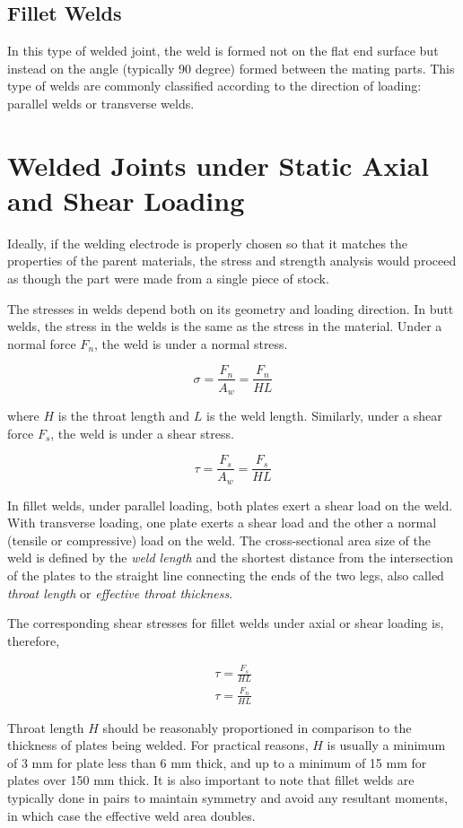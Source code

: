 \documentclass[a4paper,openany,12pt]{book}
\begin{document}
{{\subsection{Fillet Welds}
\label{fillet-welds}
In this type of welded joint, the weld is formed not on the flat end
surface but instead on the angle (typically 90 degree) formed between
the mating parts. This type of welds are commonly classified according
to the direction of loading: parallel welds or transverse welds.


\section{Welded Joints under Static Axial and Shear Loading}
\label{section: stress in weld under axial and shear}
Ideally, if the welding electrode is properly chosen so that it matches
the properties of the parent materials, the stress and strength analysis
would proceed as though the part were made from a single piece of stock.

The stresses in welds depend both on its geometry and loading direction.
In butt welds, the stress in the welds is the same as the stress in the
material. Under a normal force \(F_n\), the weld is under a normal stress.


$$\sigma  = \frac{F_n}{A_w} = \frac{F_n}{HL}$$

where \(H\) is the throat length and \(L\) is the weld length. Similarly,
under a shear force \(F_s\), the weld is under a shear stress.

$$\tau  = \frac{F_s}{A_w} = \frac{F_s}{HL}$$

In fillet welds, under parallel loading, both plates exert a shear load
on the weld. With transverse loading, one plate exerts a shear load and
the other a normal (tensile or compressive) load on the weld. The
cross-sectional area size of the weld is defined by the \emph{weld length}
and the shortest distance from the intersection of the plates to the
straight line connecting the ends of the two legs, also called \emph{throat
length} or \emph{effective throat thickness}.


The corresponding shear stresses for fillet welds under axial or shear
loading is, therefore,

$$\begin{gathered}
    \tau = \frac{F_s}{HL} \\
    \tau = \frac{F_n}{HL}
  \end{gathered}$$

Throat length \(H\) should be reasonably proportioned in comparison to the
thickness of plates being welded. For practical reasons, \(H\) is usually
a minimum of 3 mm for plate less than 6 mm thick, and up to a minimum of
15 mm for plates over 150 mm thick. It is also important to note that
fillet welds are typically done in pairs to maintain symmetry and avoid
any resultant moments, in which case the effective weld area doubles.

}}
\end{document}
